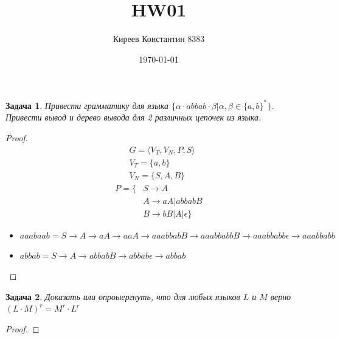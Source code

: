 \documentclass{article}
\title{HW01}
\author{Киреев Константин 8383}
\date{\today}
\newtheorem{problem}{Задача}
\begin{document}
\maketitle    
\renewcommand*{\proofname}{\textbf{Решение}}
    \begin{problem}
        Привести грамматику для языка $\{\alpha \cdot abbab \cdot \beta | \alpha, \beta \in \{a, b\}^*\}$. Привести вывод и дерево вывода для 2 различных цепочек из языка.
    \end{problem}
    \begin{proof}
        \begin{align*}            
            &G = \langle V_T, V_N, P, S \rangle \\
            &V_T = \{a, b\} \\
            &V_N = \{S, A, B\}
        \end{align*}
        \begin{align*}  
            P = \{&S\rightarrow A \\ 
            &A \rightarrow aA | abbabB \\
            &B \rightarrow bB | A | \epsilon \} 
        \end{align*}
        
        \begin{itemize}
            \item $aaabaab = S\rightarrow A \rightarrow aA\rightarrow aaA\rightarrow aaabbabB\rightarrow aaabbabbB\rightarrow aaabbabb\epsilon\rightarrow aaabbabb$
            \item $abbab = S\rightarrow A\rightarrow abbabB \rightarrow abbab\epsilon\rightarrow abbab$
        \end{itemize}
        \begin{figure}[h!]
        \end{figure}
    \end{proof}   
    \newpage
    \begin{problem}
        Доказать или опроыергнуть, что для любых языков $L$ и $M$ верно $(L\cdot M)^r = M^r \cdot L^r$
    \end{problem}
    \begin{proof}
        
    \end{proof}
\end{document}
